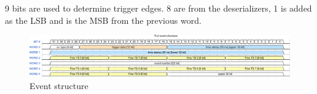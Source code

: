 9 bits are used to determine trigger edges. 8 are from the deserializers, 1 is added as the LSB and is the MSB from the previous word.

\begin{figure}
  \centering
  \includegraphics[width=.95\textwidth]{./Images/fifo_words.pdf}
  \caption{Event structure}
  \label{fig:fifo_event}
\end{figure}
